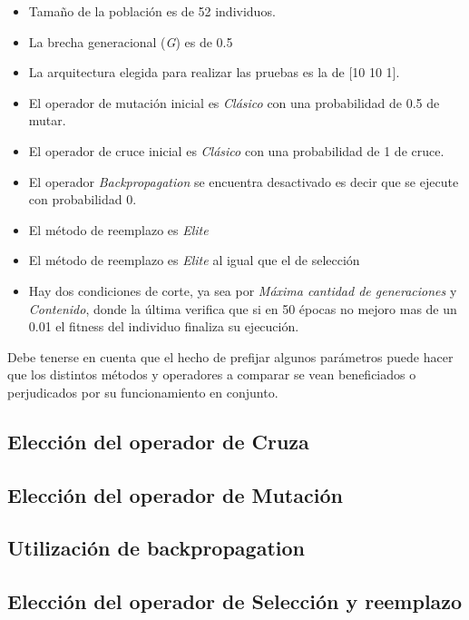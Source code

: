 \documentclass{sig-alternate}
\begin{document}
	\begin{itemize}
		\item Tamaño de la población es de 52 individuos.
		\item La brecha generacional (\textit{G}) es de 0.5
		\item La arquitectura elegida para realizar las pruebas es la de [10 10 1].
		\item El operador de mutación inicial es \textit{Clásico} con una probabilidad de 0.5 de mutar.
		\item El operador de cruce inicial es \textit{Clásico} con una probabilidad de 1 de cruce.
		\item El operador \textit{Backpropagation} se encuentra desactivado es decir que se ejecute con probabilidad 0.
		\item El método de reemplazo es \textit{Elite}
		\item El método de reemplazo es \textit{Elite} al igual que el de selección
		\item Hay dos condiciones de corte, ya sea por \textit{Máxima cantidad de generaciones} y \textit{Contenido}, donde la última verifica que si en 50 épocas no mejoro mas de un 0.01 el fitness del individuo finaliza su ejecución.
	\end{itemize}

	Debe tenerse en cuenta que el hecho de prefijar algunos parámetros puede hacer que los distintos métodos y operadores a comparar se vean beneficiados o perjudicados por su funcionamiento en conjunto.

	\subsection{Elección del operador de Cruza}

	\subsection{Elección del operador de Mutación}

	\subsection{Utilización de backpropagation}

	\subsection{Elección del operador de Selección y reemplazo}
\end{document}
